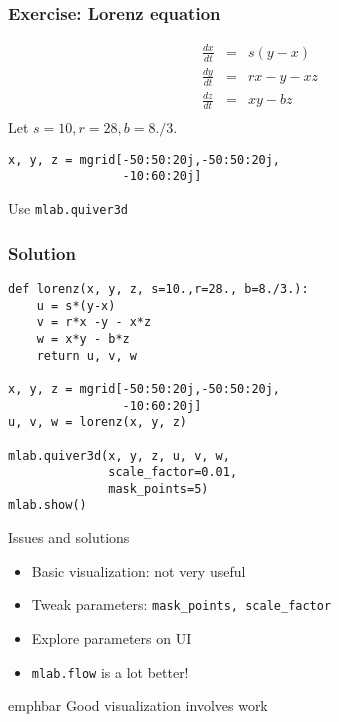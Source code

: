 \documentclass[14pt,compress]{beamer}
\newcommand{\emphbar}[1]
{\begin{beamercolorbox}[rounded=true]{emphbar} 
      {#1}
 \end{beamercolorbox}
}
\newcounter{time}
\newcommand{\inctime}[1]{\addtocounter{time}{#1}{\tiny \thetime\ m}}
\newcommand{\PythonCode}[1]{\lstinline{#1}}
\begin{document}
\begin{frame}
    \frametitle{Exercise: Lorenz equation}
    \begin{eqnarray*}
        \frac{d x}{dt} &=& s (y-x)\\
        \frac{d y}{d t} &=& rx -y -xz\\
        \frac{d z}{d t} &=& xy - bz\\
    \end{eqnarray*}
Let $s=10,r=28, b=8./3.$
\vspace*{0.2in}

  \begin{lstlisting}
x, y, z = mgrid[-50:50:20j,-50:50:20j,
                -10:60:20j]
 \end{lstlisting}

 Use \PythonCode{mlab.quiver3d}

\end{frame}

\begin{frame}
    \frametitle{Solution}
  \begin{lstlisting}
def lorenz(x, y, z, s=10.,r=28., b=8./3.):
    u = s*(y-x)
    v = r*x -y - x*z
    w = x*y - b*z
    return u, v, w

x, y, z = mgrid[-50:50:20j,-50:50:20j,
                -10:60:20j]
u, v, w = lorenz(x, y, z)

mlab.quiver3d(x, y, z, u, v, w,
              scale_factor=0.01,
              mask_points=5)
mlab.show()
 \end{lstlisting}
\end{frame}

\begin{frame}[plain]
    {Issues and solutions}

    \begin{itemize}

        \item Basic visualization: not very useful

        \item Tweak parameters: \PythonCode{mask_points, scale_factor}

        \item Explore parameters on UI

        \item \PythonCode{mlab.flow} is a lot better!

    \end{itemize}

    \emphbar{\alert{Good} visualization involves work}
 
    \inctime{20}
\end{frame}
\end{document}
